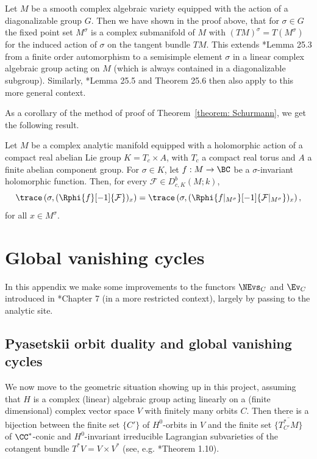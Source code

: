 \documentclass[11pt,letterpaper]{amsart}
\numberwithin{equation}{section}
\begin{document}
\begin{remark}\label{smooth-fixed-points}
 Let $M$ be a smooth complex algebraic variety equipped with the action of a diagonalizable group $G$. Then we have shown in the proof above, that for
$\sigma\in G$ the fixed point set 
$M^{\sigma}$ is a complex submanifold of $M$
with $(TM)^\sigma = T(M^\sigma)$ for the induced action of $\sigma$ on the tangent bundle $TM$. 
This extends \cite{ABV92}*{Lemma 25.3} from a finite order automorphism to a semisimple element $\sigma$  in a linear complex algebraic group acting on $M$ (which is always contained in a diagonalizable subgroup).
Similarly, \cite{ABV92}*{Lemma 25.5 and Theorem 25.6} then also apply to this more general context.
\end{remark}

As a corollary of the method of proof of Theorem~\ref{theorem: Schurmann}, we get the following result.

\begin{theorem}\label{theorem: Schurmann analytic}
Let $M$ be a complex analytic manifold equipped with a holomorphic action of a compact real abelian Lie group $K = T_c\times A$, with $T_c$ a  compact real torus and $A$ a finite abelian component group. 
For $\sigma\in K$, let $f: M\to \BC$ be a $\sigma$-invariant holomorphic function.
Then, for every $\mathcal{F}\in D^b_{c,K}(M;k)$,
\begin{equation}\label{trace-van-an}
\trace\left(\sigma, (\Rphi{f}[-1]{ \mathcal{F}})_x \right)
=
\trace\left(\sigma, (\Rphi{f\vert_{M^\sigma}}[-1]{ \mathcal{F}\vert_{M^\sigma}})_x \right),
\end{equation}
for all $x\in M^\sigma$.
\end{theorem}

\section{Global vanishing cycles}\label{section: global vanishing cycles}

In this appendix we make some improvements to the functors $\NEvs_C$ and $\Ev_C$ introduced in \cite{CFMMX22}*{Chapter 7}
(in a more restricted context), largely by passing to the analytic site.

\subsection{Pyasetskii orbit duality and global vanishing cycles}\label{subsection: PDGV}

We now move to the geometric situation showing up in this project, assuming that $H$ is a complex (linear) algebraic group 
acting linearly on a (finite dimensional) complex vector space $V$ with finitely many orbits $C$. Then there is a bijection between the finite set $\{C'\}$ of $H^0$-orbits in $V$ and the finite set $\{\overline{T^*_{C'} M}\}$  of $\CC^*$-conic and $H^0$-invariant irreducible Lagrangian subvarieties of the cotangent bundle $T^*V=V\times V^*$
(see, e.g. \cite{Tev05}*{Theorem 1.10}).
\end{document}
